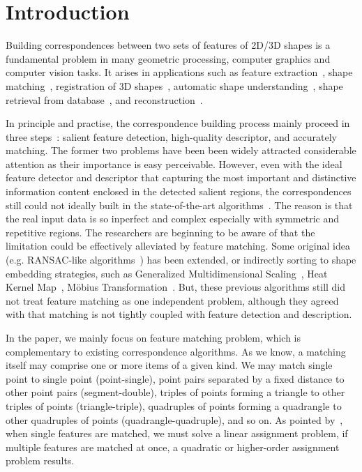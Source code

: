 \section{Introduction}
\label{sec:introduction}

Building correspondences between two sets of features of 2D/3D shapes is a fundamental problem in many geometric processing,
computer graphics and computer vision tasks.
It arises in applications such as feature extraction~\cite{Johnson99,Lowe04,Sun09,Toler10,Leutenegger11},
shape matching~\cite{Belongie02,Berg05,Brown07,Tevs09,Ovsjanikov10,Tevs11,SahilliogluY11,Windheuser11}, registration of 3D shapes~\cite{Gelfand05,Aiger08,li08,Zeng10,vanKaick11,Chang11},
automatic shape understanding~\cite{Lipman09,Sun10,Kim11}, shape retrieval from database~\cite{Bronstein11}, and reconstruction~\cite{Brown07,Chang11}.

In principle and practise, the correspondence building process mainly proceed in three steps~\cite{Lowe04,Leutenegger11}: 
salient feature detection, high-quality descriptor, and accurately matching.
The former two problems have been been widely attracted considerable attention as their importance is easy perceivable.
However, even with the ideal feature detector and descriptor that capturing the most important and distinctive information content enclosed in the detected salient regions,
the correspondences still could not ideally built in the state-of-the-art algorithms~\cite{vanKaick11}.
The reason is that the real input data is so inperfect and complex especially with symmetric and repetitive regions.
The researchers are beginning to be aware of that the limitation could be effectively alleviated by feature matching. 
Some original idea (e.g. RANSAC-like algorithms~\cite{Tevs09,Tevs11}) has been extended,
or indirectly sorting to shape embedding strategies, such as Generalized Multidimensional Scaling~\cite{Bronstein11}, 
Heat Kernel Map~\cite{Ovsjanikov10}, M{\"o}bius Transformation~\cite{Lipman09,Kim11}. 
But, these previous algorithms still did not treat feature matching as one independent problem, 
although they agreed with that matching is not tightly coupled with feature detection and description.

In the paper, we mainly focus on feature matching problem, which is complementary to existing correspondence algorithms. 
As we know, a matching itself may comprise one or more items of a given kind.
We may match single point to single point (point-single),
point pairs separated by a fixed distance to other point pairs (segment-double),
triples of points forming a triangle to other triples of points (triangle-triple),
quadruples of points forming a quadrangle to other quadruples of points (quadrangle-quadruple), and so on.
As pointed by~\cite{Conte04}, when single features are matched, 
we must solve a linear assignment problem, if multiple features are matched at once,
a quadratic or higher-order assignment problem results.

